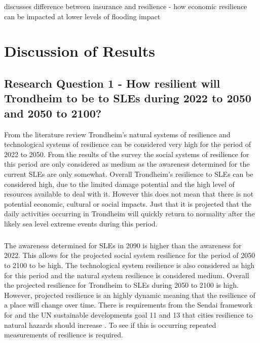 



\cite{cutter_community_2020} discusses difference between insurance and resilience - how economic resilience can be impacted at lower levels of flooding impact

\chapter{Discussion of Results}

\section{Research Question 1 - How resilient will Trondheim to be to SLEs during 2022 to 2050 and 2050 to 2100? }
From the literature review Trondheim's natural systems of resilience and technological systems of resilience can be considered very high for the period of 2022 to 2050. From the results of the survey the  social systems of resilience for this period are only considered as medium as the awareness determined for the current SLEs are only somewhat. Overall Trondheim's resilience to SLEs can be considered high, due to the limited damage potential and the high level of resources available to deal with it. However this does not mean that there is not potential economic, cultural or social impacts. Just that it is projected that the daily activities occurring in Trondheim will quickly return to normality after the likely sea level extreme events during this period.
\paragraph{}
The awareness determined for SLEs in 2090 is higher than the awareness for 2022. This allows for the projected social system resilience for the period of 2050 to 2100 to be high. The technological system resilience is also considered as high for this period and the natural system resilience is considered medium. Overall the projected resilience for Trondheim to SLEs during 2050 to 2100 is high. However, projected resilience is an highly dynamic meaning that the resilience of a place will change over time. There is requirements from the Sendai framework for and the UN sustainable developments goal 11 and 13 that cities resilience to natural hazards should increase \cite{gonzalez-riancho_storm_2017}. To see if this is occurring repeated measurements of resilience is required. 

